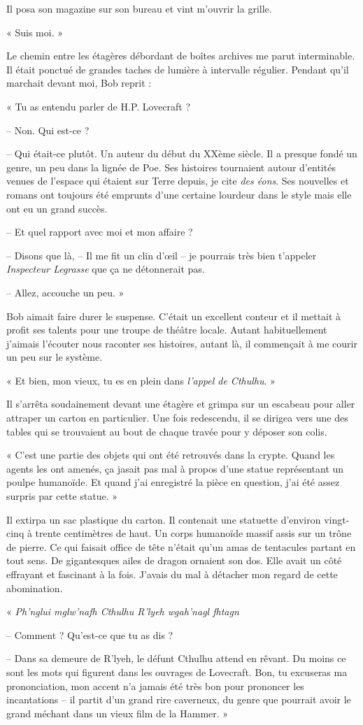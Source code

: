 Il posa son magazine sur son bureau et vint m'ouvrir la grille.

« Suis moi. »

Le chemin entre les étagères débordant de boîtes archives me parut interminable. Il était ponctué de grandes taches de
lumière à intervalle régulier. Pendant qu'il marchait devant moi, Bob reprit :

« Tu as entendu parler de H.P. Lovecraft ?

-- Non. Qui est-ce ?

-- Qui était-ce plutôt. Un auteur du début du XXème siècle. Il a presque fondé un genre, un peu dans la lignée de Poe.
Ses histoires tournaient autour d'entités venues de l'espace qui étaient sur Terre depuis, je cite \emph{des éons}. Ses
nouvelles et romans ont toujours été emprunts d'une certaine lourdeur dans le style mais elle ont eu un grand succès.

-- Et quel rapport avec moi et mon affaire ?

-- Disons que là, -- Il me fit un clin d'œil -- je pourrais très bien t'appeler \emph{Inspecteur Legrasse} que ça ne
détonnerait pas.

-- Allez, accouche un peu. »

Bob aimait faire durer le suspense. C'était un excellent conteur et il mettait à profit ses talents pour une troupe de
théâtre locale. Autant habituellement j'aimais l'écouter nous raconter ses histoires, autant là, il commençait à me
courir un peu sur le système.

« Et bien, mon vieux, tu es en plein dans \emph{l'appel de Cthulhu}. »

Il s'arrêta soudainement devant une étagère et grimpa sur un escabeau pour aller attraper un carton en particulier. Une
fois redescendu, il se dirigea vers une des tables qui se trouvaient au bout de chaque travée pour y déposer son colis.

« C'est une partie des objets qui ont été retrouvés dans la crypte. Quand les agents les ont amenés, ça jasait pas mal
à propos d'une statue représentant un poulpe humanoïde. Et quand j'ai enregistré la pièce en question, j'ai été assez
surpris par cette statue. »

Il extirpa un sac plastique du carton. Il contenait une statuette d'environ vingt-cinq à trente centimètres de haut. Un
corps humanoïde massif assis sur un trône de pierre. Ce qui faisait office de tête n'était qu'un amas de tentacules
partant en tout sens. De gigantesques ailes de dragon ornaient son dos. Elle avait un côté effrayant et fascinant à la
fois. J'avais du mal à détacher mon regard de cette abomination.

« \emph{Ph’nglui mglw’nafh Cthulhu R’lyeh wgah’nagl fhtagn}

-- Comment ? Qu'est-ce que tu as dis ?

-- Dans sa demeure de R'lyeh, le défunt Cthulhu attend en rêvant. Du moins ce sont les mots qui figurent dans les
ouvrages de Lovecraft. Bon, tu excuseras ma prononciation, mon accent n'a jamais été très bon pour prononcer les
incantations -- il partit d'un grand rire caverneux, du genre que pourrait avoir le grand méchant dans un vieux film de
la Hammer. »

